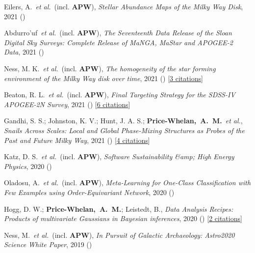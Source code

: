 \item[{\color{deemph}\scriptsize14}]Eilers, A.~\textit{et al.}~(incl. \textbf{APW}), \textit{Stellar Abundance Maps of the Milky Way Disk}, 2021 ()

\item[{\color{deemph}\scriptsize13}]Abdurro'uf~\textit{et al.}~(incl. \textbf{APW}), \textit{The Seventeenth Data Release of the Sloan Digital Sky Surveys: Complete Release of MaNGA, MaStar and APOGEE-2 Data}, 2021 ()

\item[{\color{deemph}\scriptsize12}]Ness, M. K.~\textit{et al.}~(incl. \textbf{APW}), \textit{The homogeneity of the star forming environment of the Milky Way disk over time}, 2021 () [\href{http://adsabs.harvard.edu/abs/2021arXiv210905722N}{3 citations}]

\item[{\color{deemph}\scriptsize11}]Beaton, R. L.~\textit{et al.}~(incl. \textbf{APW}), \textit{Final Targeting Strategy for the SDSS-IV APOGEE-2N Survey}, 2021 () [\href{http://adsabs.harvard.edu/abs/2021arXiv210811907B}{6 citations}]

\item[{\color{deemph}\scriptsize10}]Gandhi, S. S.; Johnston, K. V.; Hunt, J. A. S.; \textbf{Price-Whelan,~A.~M.}~\textit{et al.}, \textit{Snails Across Scales: Local and Global Phase-Mixing Structures as Probes of the Past and Future Milky Way}, 2021 () [\href{http://adsabs.harvard.edu/abs/2021arXiv210703562G}{4 citations}]

\item[{\color{deemph}\scriptsize9}]Katz, D. S.~\textit{et al.}~(incl. \textbf{APW}), \textit{Software Sustainability {\&}amp; High Energy Physics}, 2020 ()

\item[{\color{deemph}\scriptsize8}]Oladosu, A.~\textit{et al.}~(incl. \textbf{APW}), \textit{Meta-Learning for One-Class Classification with Few Examples using Order-Equivariant Network}, 2020 ()

\item[{\color{deemph}\scriptsize7}]Hogg, D. W.; \textbf{Price-Whelan,~A.~M.}; Leistedt, B., \textit{Data Analysis Recipes: Products of multivariate Gaussians in Bayesian inferences}, 2020 () [\href{http://adsabs.harvard.edu/abs/2020arXiv200514199H}{2 citations}]

\item[{\color{deemph}\scriptsize6}]Ness, M.~\textit{et al.}~(incl. \textbf{APW}), \textit{In Pursuit of Galactic Archaeology: Astro2020 Science White Paper}, 2019 ()


